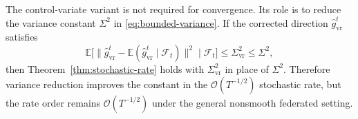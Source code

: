 The control-variate variant is not required for convergence. Its role is to
reduce the variance constant $\Sigma^2$ in \eqref{eq:bounded-variance}. If the
corrected direction $\widehat{g}_{\mathrm{vr}}^t$ satisfies
\begin{equation}
    \mathbb{E}
    \big[
    \|\widehat{g}_{\mathrm{vr}}^t
    -
    \mathbb{E}(\widehat{g}_{\mathrm{vr}}^t\mid\mathcal{F}_t)\|^2
    \mid \mathcal{F}_t
    \big]
    \le
    \Sigma_{\mathrm{vr}}^2
    \le
    \Sigma^2 ,
\end{equation}
then Theorem~\ref{thm:stochastic-rate} holds with $\Sigma_{\mathrm{vr}}^2$ in
place of $\Sigma^2$. Therefore variance reduction improves the constant in the
$\mathcal{O}(T^{-1/2})$ stochastic rate, but the rate order remains
$\mathcal{O}(T^{-1/2})$ under the general nonsmooth federated setting.

